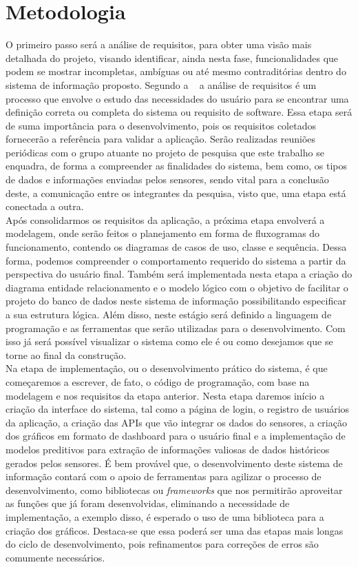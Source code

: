 \documentclass[tcc-proposta]{texufpel}
\begin{document}
\chapter{Metodologia}
O primeiro passo será a análise de requisitos, para obter uma visão mais detalhada do projeto, visando identificar, ainda nesta fase, funcionalidades que podem se mostrar incompletas, ambíguas ou até mesmo contraditórias dentro do sistema de informação proposto. Segundo a ~\citet{IEEE:1990} a análise de requisitos é um processo que envolve o estudo das necessidades do usuário para se encontrar uma definição correta ou completa do sistema ou requisito de software. Essa etapa será de suma importância para o desenvolvimento, pois os requisitos coletados fornecerão a referência para validar a aplicação. Serão realizadas reuniões periódicas com o grupo atuante no projeto de pesquisa que este trabalho se enquadra, de forma a compreender as finalidades do sistema, bem como, os tipos de dados e informações enviadas pelos sensores, sendo vital para a conclusão deste, a comunicação entre os integrantes da pesquisa, visto que, uma etapa está conectada a outra.
\\

Após consolidarmos os requisitos da aplicação, a próxima etapa envolverá a modelagem, onde serão feitos o planejamento em forma de fluxogramas do funcionamento, contendo os diagramas de casos de uso, classe e sequência. Dessa forma, podemos compreender o comportamento requerido do sistema a partir da perspectiva do usuário final. Também será implementada nesta etapa a criação do diagrama entidade relacionamento e o modelo lógico com o objetivo de facilitar o projeto do banco de dados neste sistema de informação possibilitando especificar a sua estrutura lógica. Além disso, neste estágio será definido a linguagem de programação e as ferramentas que serão utilizadas para o desenvolvimento. Com isso já será possível visualizar o sistema como ele é ou como desejamos que se torne ao final da construção.
\\

Na etapa de implementação, ou o desenvolvimento prático do sistema, é que começaremos a escrever, de fato, o código de programação, com base na modelagem e nos requisitos da etapa anterior. Nesta etapa daremos início a criação da interface do sistema, tal como a página de login, o registro de usuários da aplicação, a criação das APIs que vão integrar os dados do sensores, a criação dos gráficos em formato de dashboard para o usuário final e a implementação de modelos preditivos para extração de informações valiosas de dados históricos gerados pelos sensores. É bem provável que, o desenvolvimento deste sistema de informação contará com o apoio de ferramentas para agilizar o processo de desenvolvimento, como bibliotecas ou \textit{frameworks} que nos permitirão aproveitar as funções que já foram desenvolvidas, eliminando a necessidade de implementação, a exemplo disso, é esperado o uso de uma biblioteca para a criação dos gráficos. Destaca-se que essa poderá ser uma das etapas mais longas do ciclo de desenvolvimento, pois refinamentos para correções de erros são comumente necessários.
\\
\end{document}
